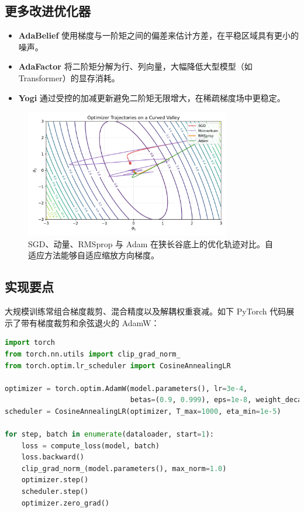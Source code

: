 \documentclass[UTF8,zihao=-4]{ctexart}
\begin{document}
\subsection{更多改进优化器}
\begin{itemize}
  \item \textbf{AdaBelief} 使用梯度与一阶矩之间的偏差来估计方差，在平稳区域具有更小的噪声。
  \item \textbf{AdaFactor} 将二阶矩分解为行、列向量，大幅降低大型模型（如 Transformer）的显存消耗。
  \item \textbf{Yogi} 通过受控的加减更新避免二阶矩无限增大，在稀疏梯度场中更稳定。
\end{itemize}

\begin{figure}[H]
  \centering
  \includegraphics[width=0.8\textwidth]{optimizer_dynamics.png}
  \caption{SGD、动量、RMSprop 与 Adam 在狭长谷底上的优化轨迹对比。自适应方法能够自适应缩放方向梯度。}
  \label{fig:optimizer_dynamics_cn}
\end{figure}
\FloatBarrier

\subsection{实现要点}
大规模训练常组合梯度裁剪、混合精度以及解耦权重衰减。如下 PyTorch 代码展示了带有梯度裁剪和余弦退火的 AdamW：

\begin{lstlisting}[language=Python, caption={结合梯度裁剪与余弦调度的 AdamW 训练循环。}]
import torch
from torch.nn.utils import clip_grad_norm_
from torch.optim.lr_scheduler import CosineAnnealingLR

optimizer = torch.optim.AdamW(model.parameters(), lr=3e-4,
                              betas=(0.9, 0.999), eps=1e-8, weight_decay=0.01)
scheduler = CosineAnnealingLR(optimizer, T_max=1000, eta_min=1e-5)

for step, batch in enumerate(dataloader, start=1):
    loss = compute_loss(model, batch)
    loss.backward()
    clip_grad_norm_(model.parameters(), max_norm=1.0)
    optimizer.step()
    scheduler.step()
    optimizer.zero_grad()
\end{lstlisting}
\end{document}

